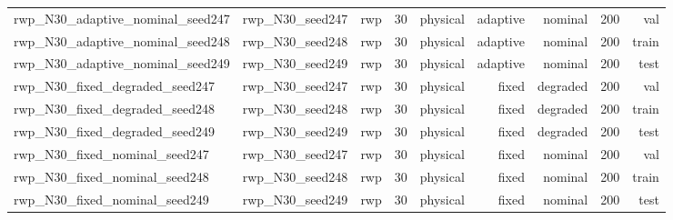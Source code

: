 \begin{tabular}{lrrrrrrrr}
rwp\_N30\_adaptive\_nominal\_seed247 & rwp\_N30\_seed247 & rwp & 30 & physical & adaptive & nominal & 200 & val \\
rwp\_N30\_adaptive\_nominal\_seed248 & rwp\_N30\_seed248 & rwp & 30 & physical & adaptive & nominal & 200 & train \\
rwp\_N30\_adaptive\_nominal\_seed249 & rwp\_N30\_seed249 & rwp & 30 & physical & adaptive & nominal & 200 & test \\
rwp\_N30\_fixed\_degraded\_seed247 & rwp\_N30\_seed247 & rwp & 30 & physical & fixed & degraded & 200 & val \\
rwp\_N30\_fixed\_degraded\_seed248 & rwp\_N30\_seed248 & rwp & 30 & physical & fixed & degraded & 200 & train \\
rwp\_N30\_fixed\_degraded\_seed249 & rwp\_N30\_seed249 & rwp & 30 & physical & fixed & degraded & 200 & test \\
rwp\_N30\_fixed\_nominal\_seed247 & rwp\_N30\_seed247 & rwp & 30 & physical & fixed & nominal & 200 & val \\
rwp\_N30\_fixed\_nominal\_seed248 & rwp\_N30\_seed248 & rwp & 30 & physical & fixed & nominal & 200 & train \\
rwp\_N30\_fixed\_nominal\_seed249 & rwp\_N30\_seed249 & rwp & 30 & physical & fixed & nominal & 200 & test \\
\bottomrule
\end{tabular}